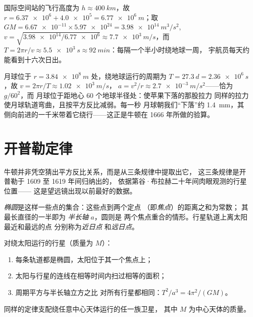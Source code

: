 \begin{example}[空间站]\label{ex:g12:satellites-kepler:iss}
国际空间站的飞行高度为
$h \approx \qty{400}{km}$，故 $r = \num{6.37e6} + \num{4.0e5} =
\qty{6.77e6}{m}$；取 $GM = \num{6.67e-11} \times \num{5.97e24} =
\qty{3.98e14}{m^3/s^2}$, $v = \sqrt{\num{3.98e14}/\num{6.77e6}}
\approx \qty{7.7e3}{m/s}$，而 $T = 2\pi r/v \approx \qty{5.5e3}{s}
\approx \qty{92}{min}$：每隔一个半小时绕地球一周，
宇航员每天约能看到十六次日出。
\end{example}

\begin{example}[月球像苹果一样下落]\label{ex:g12:satellites-kepler:moon}
月球位于 $r = \qty{3.84e8}{m}$ 处，绕地球运行的周期为 $T = \qty{27.3}{d} =
\qty{2.36e6}{s}$，故 $v = 2\pi r/T \approx \qty{1.02e3}{m/s}$，
$a = v^2/r \approx \qty{2.7e-3}{m/s^2}$——恰为 $g/60^2$，而
月球位于距地心 $60$ 个地球半径处：使苹果下落的那股拉力
同样的拉力使月球轨道弯曲，且按平方反比减弱。每一秒
月球朝我们“下落”约 \qty{1.4}{mm}，其
侧向前进的一千米带着它绕行——这正是牛顿在 1666 年所做的验算。
\end{example}

\section{开普勒定律}

牛顿并非凭空猜出平方反比关系，而是从三条规律中提取出它，
这三条规律是开普勒于 1609 至 1619 年间归纳出的，
依据第谷·布拉赫二十年间肉眼观测的行星位置——
这是望远镜出现以前最好的数据。

\begin{definition}[椭圆]\label{def:g12:satellites-kepler:ellipse}
\emph{椭圆}是这样一些点的集合：这些点到两个定点
（即\emph{焦点}）的距离之和为常数；
其最长直径的一半即为
\emph{半长轴} $a$，圆则是
两个焦点重合的情形。行星轨道上离太阳最近和最远的点
分别称为\emph{近日点}
和\emph{远日点}。
\end{definition}

\begin{theorem}[开普勒定律]\label{thm:g12:satellites-kepler:kepler}
%
对绕太阳运行的行星（质量为 $M$）：
\begin{enumerate}
  \item 每条轨道都是椭圆，太阳位于其一个焦点上；
  \item 太阳与行星的连线在相等时间内扫过相等的面积；
  \item 周期平方与半长轴立方之比
        对所有行星都相同：$T^2/a^3 = 4\pi^2/(G M)$。
\end{enumerate}
同样的定律支配绕任意中心天体运行的任一族卫星，
其中 $M$ 为中心天体的质量。\admitted
\end{theorem}


